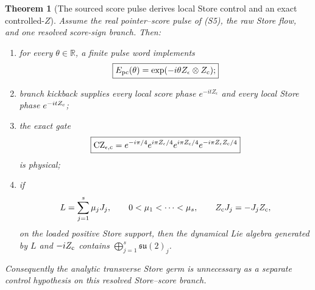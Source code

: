 \documentclass[11pt]{article}
\newtheorem{theorem}{Theorem}[section]
\theoremstyle{definition}
\theoremstyle{remark}
\newcommand{\R}{\mathbb R}
\begin{document}
\begin{theorem}[The sourced score pulse derives local Store control and an exact
controlled-$Z$]
\label{thm:canonical-score-control-master}
Assume the real pointer--score pulse of
\textup{(S5)}, the raw Store flow, and one
resolved score-sign branch.  Then:
\begin{enumerate}[label=\textup{(\roman*)},leftmargin=2.8em]
\item for every $\theta\in\R$, a finite pulse word implements
      \begin{equation}
       \boxed{
       E_{\rm pc}(\theta)
       =\exp(-i\theta Z_{\epsilon}\otimes Z_{\rm c});}
       \label{eq:score-Ising-master}
      \end{equation}
\item branch kickback supplies every local score phase
      $e^{-itZ_{\epsilon}}$ and every local Store phase
      $e^{-itZ_{\rm c}}$;
\item the exact gate
      \begin{equation}
       \boxed{
       \operatorname{CZ}_{\epsilon,{\rm c}}
       =e^{-i\pi/4}
        e^{i\pi Z_{\epsilon}/4}
        e^{i\pi Z_{\rm c}/4}
        e^{-i\pi Z_{\epsilon}Z_{\rm c}/4}}
       \label{eq:score-CZ-master}
      \end{equation}
      is physical;
\item if
      \[
       L=\sum_{j=1}^{s}\mu_jJ_j,\qquad
       0<\mu_1<\cdots<\mu_s,\qquad
       Z_{\rm c}J_j=-J_jZ_{\rm c},
      \]
      on the loaded positive Store support, then the dynamical Lie algebra
      generated by $L$ and $-iZ_{\rm c}$ contains
      $\bigoplus_{j=1}^{s}\mathfrak{su}(2)_j$.
\end{enumerate}
Consequently the analytic transverse Store germ is unnecessary as a separate
control hypothesis on this resolved Store--score branch.
\end{theorem}
\end{document}
